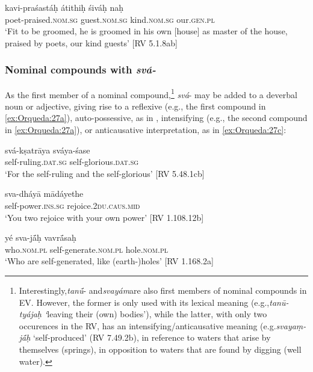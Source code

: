 \documentclass[output=paper]{langscibook}
\begin{document}
\gll kavi-praśastáḥ  átithiḥ  śiváḥ  naḥ\\
   poet-praised.\textsc{nom.sg}  guest.\textsc{nom.sg}  kind.\textsc{nom.sg}  our.\textsc{gen.pl}\\
\glt ‘Fit to be groomed, he is groomed in his own [house] as master of the house, praised by poets, our kind guests’ [RV 5.1.8ab]
\z


\subsubsection{Nominal compounds with \textit{svá-}}
\label{sec:Orqueda:2.3.2}


As the first member of a nominal compound,\footnote{{{Interestingly,}{\textit{tan\'{ū}}}{{}- and}{\textit{svayám}}{are also first members of nominal compounds in EV. However, the former is only used with its lexical meaning (e.g.,}{\textit{tanū-tyájaḥ ‘}}{leaving their (own) bodies’), while the latter, with only two occurences in the RV, has an intensifying/anticausative meaning (e.g.}{\textit{svayaṃ-j\'{ā}ḥ} }{‘self-produced’ (RV 7.49.2b), in reference to waters that arise by themselves (springs), in opposition to waters that are found by digging (well water).}}}{ \textit{svá}{}- may be added to a deverbal noun or adjective, giving rise to a reflexive (e.g., the first compound in \ref{ex:Orqueda:27a}), auto-possessive, as in , intensifying (e.g., the second compound in \ref{ex:Orqueda:27a}), or anticausative interpretation, as in \ref{ex:Orqueda:27c}:}

\ea
\label{ex:Orqueda:27}
\ea
 \label{ex:Orqueda:27a}
\gll svá-kṣatrāya  sváya-śase\\
      self-ruling.\textsc{dat.sg}  self-glorious.\textsc{dat.sg}\\
\glt ‘For the self-ruling and the self-glorious’ [RV 5.48.1cb]

\ex
 \label{ex:Orqueda:27b}
\gll  sva-dháyā  mādáyethe\\
      self-power.\textsc{ins.sg}  rejoice.\textsc{2du.caus.mid}\\
\glt ‘You two rejoice with your own power’ [RV 1.108.12b]

\ex
 \label{ex:Orqueda:27c}
\gll yé  sva-j\'{ā}ḥ  vavr\'{ā}saḥ\\
    who.\textsc{nom.pl}  self-generate.\textsc{nom.pl}  hole.\textsc{nom.pl}\\
\glt    ‘Who are self-generated, like (earth-)holes’ [RV 1.168.2a]
\z
\z
\end{document}
